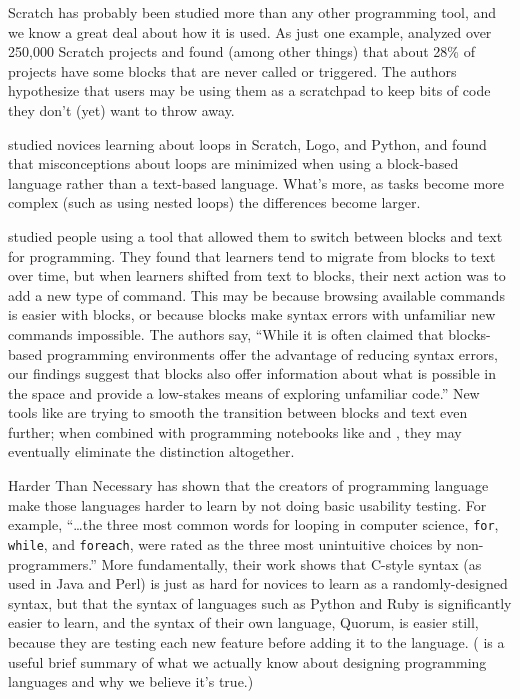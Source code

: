 Scratch has probably been studied more than any other programming tool,
and we know a great deal about how it is used. As just one example,
\cite{Aiva2016} analyzed over 250,000 Scratch projects and found
(among other things) that about 28\% of projects have some blocks that
are never called or triggered. The authors hypothesize that users may be
using them as a scratchpad to keep bits of code they don't (yet) want to
throw away.

\cite{Grov2017,Mlad2017} studied novices learning about loops in
Scratch, Logo, and Python, and found that misconceptions about loops are
minimized when using a block-based language rather than a text-based
language. What's more, as tasks become more complex (such as using
nested loops) the differences become larger.

\cite{Wein2017a} studied people using a tool that allowed them to
switch between blocks and text for programming. They found that
learners tend to migrate from blocks to text over time, but when
learners shifted from text to blocks, their next action was to add a
new type of command. This may be because browsing available commands
is easier with blocks, or because blocks make syntax errors with
unfamiliar new commands impossible. The authors say, ``While it is
often claimed that blocks-based programming environments offer the
advantage of reducing syntax errors, our findings suggest that blocks
also offer information about what is possible in the space and provide
a low-stakes means of exploring unfamiliar code.'' New tools like
 are trying to smooth the transition between blocks
and text even further; when combined with programming notebooks like
 and , they may eventually
eliminate the distinction altogether.

\begin{aside}{Harder Than Necessary}
  \cite{Stef2013} has shown that the creators of programming language
  make those languages harder to learn by not doing basic usability
  testing. For example, ``{\ldots}the three most common words for
  looping in computer science, \texttt{for}, \texttt{while}, and \texttt{foreach}, were rated
  as the three most unintuitive choices by non-programmers.'' More
  fundamentally, their work shows that C-style syntax (as used in Java
  and Perl) is just as hard for novices to learn as a randomly-designed
  syntax, but that the syntax of languages such as Python and Ruby is
  significantly easier to learn, and the syntax of their own language,
  Quorum, is easier still, because they are testing each new feature
  before adding it to the language. (\cite{Stef2017} is a useful
  brief summary of what we actually know about designing programming
  languages and why we believe it's true.)
\end{aside}

